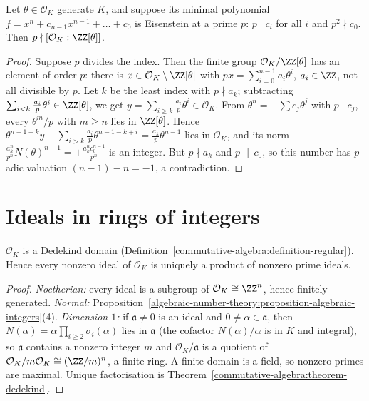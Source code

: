 \begin{lemma}\label{algebraic-number-theory:lemma-eisenstein-index}
Let $\theta \in \mathcal{O}_K$ generate $K$, and suppose its minimal polynomial $f = x^n + c_{n-1}x^{n-1} + \dots + c_0$ is Eisenstein at a prime $p$: $p \mid c_i$ for all $i$ and $p^2 \nmid c_0$. Then
$p \nmid [\mathcal{O}_K : \ZZ[\theta]]$.
\end{lemma}

\begin{proof}
Suppose $p$ divides the index. Then the finite group $\mathcal{O}_K/\ZZ[\theta]$ has an element of order $p$: there is $x \in \mathcal{O}_K \setminus \ZZ[\theta]$ with
$px = \sum_{i=0}^{n-1}a_i\theta^i$, $a_i \in \ZZ$, not all divisible by $p$. Let $k$ be the least index with $p \nmid a_k$; subtracting $\sum_{i<k}\frac{a_i}{p}\theta^i \in \ZZ[\theta]$, we get
$y = \sum_{i \geq k}\frac{a_i}{p}\theta^i \in \mathcal{O}_K$. From $\theta^n = -\sum c_j\theta^j$ with $p \mid c_j$, every $\theta^m/p$ with $m \geq n$ lies in $\ZZ[\theta]$. Hence
$\theta^{n-1-k}y - \sum_{i > k}\frac{a_i}{p}\theta^{n-1-k+i} = \frac{a_k}{p}\theta^{n-1}$ lies in $\mathcal{O}_K$, and its norm $\frac{a_k^n}{p^n}N(\theta)^{n-1} = \pm\frac{a_k^nc_0^{n-1}}{p^n}$ is an integer. But
$p \nmid a_k$ and $p \,\|\, c_0$, so this number has $p$-adic valuation $(n - 1) - n = -1$, a contradiction.
\end{proof}

\section{Ideals in rings of integers}\label{algebraic-number-theory:section-ideals}

\begin{theorem}\label{algebraic-number-theory:theorem-dedekind}
$\mathcal{O}_K$ is a Dedekind domain (Definition~\ref{commutative-algebra:definition-regular}). Hence every nonzero ideal of $\mathcal{O}_K$ is uniquely a product of nonzero prime ideals.
\end{theorem}

\begin{proof}
\emph{Noetherian:} every ideal is a subgroup of $\mathcal{O}_K \cong \ZZ^n$, hence finitely generated. \emph{Normal:} Proposition~\ref{algebraic-number-theory:proposition-algebraic-integers}(4).
\emph{Dimension $1$:} if $\mathfrak{a} \neq 0$ is an ideal and $0 \neq \alpha \in \mathfrak{a}$, then $N(\alpha) = \alpha\prod_{i \geq 2}\sigma_i(\alpha)$ lies in $\mathfrak{a}$ (the cofactor
$N(\alpha)/\alpha$ is in $K$ and integral), so $\mathfrak{a}$ contains a nonzero integer $m$ and $\mathcal{O}_K/\mathfrak{a}$ is a quotient of $\mathcal{O}_K/m\mathcal{O}_K \cong (\ZZ/m)^n$, a finite ring. A
finite domain is a field, so nonzero primes are maximal. Unique factorisation is Theorem~\ref{commutative-algebra:theorem-dedekind}.
\end{proof}

